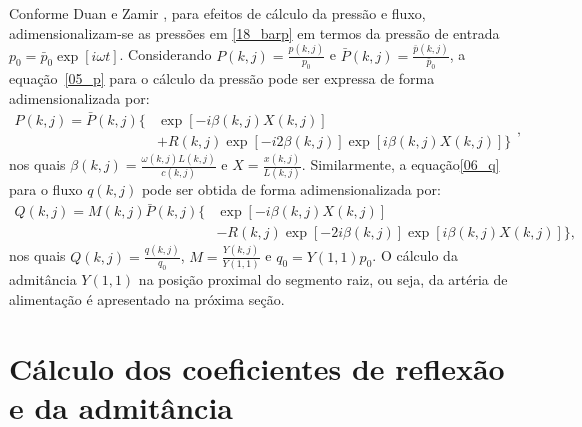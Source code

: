 \documentclass[
        english,			
        brazil			        %
        ,<...>]{abntbibufjf}
\begin{document}
Conforme Duan e Zamir \cite{Duan}, para efeitos de cálculo da pressão e fluxo, adimensionalizam-se as pressões em \eqref{18_barp} em termos da pressão de entrada $p_0 = \bar{p}_0 \exp[i\omega t]$. Considerando $P(k,j) = \frac{p(k,j)}{p_0}$ e $\bar{P} (k,j) = \frac{\bar{p}(k,j)}{\bar{p}_0}$, a equação~\eqref{05_p} para o cálculo da pressão  pode ser expressa de forma adimensionalizada por:
\begin{equation}
\begin{split}
P(k,j) = \bar{P}(k,j)\big\{&\exp[ -i\beta(k,j) X(k,j)] \\
& + R(k,j) \exp[-i2\beta(k,j)] \exp[i\beta(k,j) X(k,j)]\big\}
\end{split}
\label{21_P},
\end{equation}
nos quais $\beta(k,j) = \frac{\omega(k,j) L(k,j)}{c(k,j)}$ e $X = \frac{x(k,j)}{L(k,j)}$. Similarmente, a equação\eqref{06_q} para o fluxo $q(k,j)$ pode ser obtida de forma adimensionalizada por:
\begin{equation}
\begin{split}
Q(k,j) = M(k,j)\bar{P}(k,j)\big\{ &\exp\left[ -i\beta(k,j) X(k,j) \right] \\ 
&- R(k,j) \exp[ -2i\beta(k,j)] \exp[i\beta(k,j) X(k,j)] \big\},
\end{split}
\label{23_Q}
\end{equation}
nos quais $Q(k,j) = \frac{q (k,j)}{q_0}$, $M = \frac{Y(k,j)}{Y(1,1)}$ e $q_0 = Y(1,1)p_0$. O cálculo da admitância $Y(1,1)$ na posição proximal do segmento raiz, ou seja, da artéria de alimentação é apresentado na próxima seção.

\section{Cálculo dos coeficientes de reflexão e da admitância}
\end{document}
